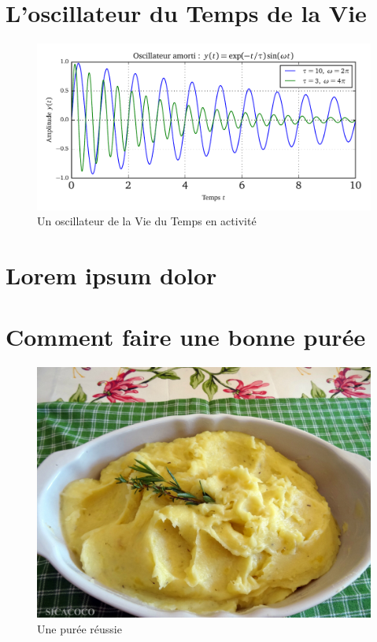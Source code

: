 \documentclass[10pt,a4paper]{article}
\begin{document}
\section{L'oscillateur du Temps de la Vie}
\begin{figure}[h]
\begin{center}
\includegraphics{Oscillateur}
\end{center}
\caption{Un oscillateur de la Vie du Temps en activité}
\end{figure}

\section{Lorem ipsum dolor}

\lipsum[1-13]

\section{Comment faire une bonne purée}
\begin{figure}[h]
\begin{center}
\includegraphics[width = .8\textwidth]{96234589_o}
\end{center}
\caption{Une purée réussie}
\label{fig:puree}
\end{figure}
\end{document}
